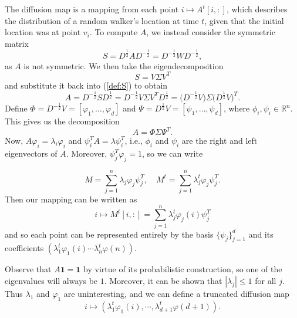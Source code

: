 \documentclass{article}
\numberwithin{equation}{section}
\theoremstyle{definition}
\begin{document}
The diffusion map is a mapping from each point $i \mapsto A^t[i,:]$, which describes the distribution of a random walker's location at time $t$, given that the initial location was at point $v_i$. To compute $A$, we instead consider the symmetric matrix
\begin{equation}\label{def:S}
    S = D^{\frac{1}{2}}AD^{-\frac{1}{2}} = D^{-\frac{1}{2}}WD^{-\frac{1}{2}},
\end{equation}
as $A$ is not symmetric. We then take the eigendecomposition
\begin{equation}
    S = V\Sigma V^T
\end{equation}
and substitute it back into (\ref{def:S}) to obtain
\begin{equation}
A = D^{-\frac{1}{2}}SD^{\frac{1}{2}} = D^{-\frac{1}{2}}V\Sigma V^TD^{\frac{1}{2}} = \big(D^{-\frac{1}{2}}V\big)\Sigma\big(D^{\frac{1}{2}}V\big)^T.
\end{equation}
Define $\Phi = D^{-\frac{1}{2}}V = [\varphi_1, \ldots, \varphi_d]$ and $\Psi = D^{\frac{1}{2}}V = [\psi_1, \ldots, \psi_d]$, where $\phi_i, \psi_i \in \mathbb{R}^n$. This gives us the decomposition
\begin{equation}
A = \Phi \Sigma \Psi^T.
\end{equation}
Now, $A\varphi_i = \lambda_i\varphi_i$ and $\psi^T_iA = \lambda\psi^T_i$, i.e., $\phi_i$ and $\psi_i$ are the right and left eigenvectors of $A$. Moreover, $\psi^T_j \varphi_j = 1$, so we can write

\begin{equation}
    M = \sum_{j=1}^n \lambda_j \varphi_j \psi^T_j, \quad M^t = \sum_{j=1}^n \lambda^t_j \varphi_j \psi^T_j.
\end{equation}
Then our mapping can be written as
\begin{equation}
    i \mapsto M^t[i,:] = \sum_{j=1}^n \lambda^t_j \varphi_j(i)\psi^T_j
\end{equation}
and so each point can be represented entirely by the basis $\{\psi_j\}_{j=1}^d$ and its coefficients $(\lambda^t_1\varphi_1(i) \cdots \lambda^t_n\varphi(n))$. 

Observe that $A\mathbf{1} = \mathbf{1}$ by virtue of its probabilistic construction, so one of the eigenvalues will always be $1$. Moreover, it can be shown that $|\lambda_j| \le 1$ for all $j$. Thus $\lambda_1$ and $\varphi_1$ are uninteresting, and we can define a truncated diffusion map
\begin{equation}
    i \mapsto (\lambda^t_1\varphi_1(i), \cdots ,\lambda^t_{d+1}\varphi(d+1)).
\end{equation}
\end{document}
